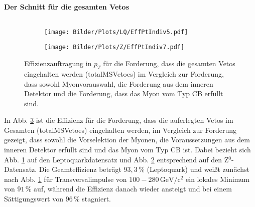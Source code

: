 \paragraph{Der Schnitt für die gesamten Vetos}$~~$\\
\begin{figure}
  \begin{subfigure}[t]{0.55\textwidth}
  \texttt{[image: Bilder/Plots/LQ/EffPtIndiv5.pdf]}
  \label{EffPtIndiv5LQ}
  \end{subfigure}
\begin{subfigure}[t]{0.55\textwidth}
 \texttt{[image: Bilder/Plots/Z/EffPtIndiv7.pdf]}
  \label{EffPtIndiv5Z}
\end{subfigure}
\caption{Effizienzauftragung in $p_T$ für die Forderung, dass die gesamten Vetos eingehalten werden (totalMSVetoes) im Vergleich zur Forderung, dass sowohl Myonvorauswahl, die Forderung aus dem inneren Detektor und die Forderung, dass das Myon vom Typ CB erfüllt sind.}
\label{EffPtIndiv5}
\end{figure}
In Abb. \ref{EffPtIndiv5} ist die Effizienz für die Forderung, dass die auferlegten Vetos im Gesamten (totalMSVetoes) eingehalten werden, im Vergleich zur Forderung gezeigt, dass sowohl die Vorselektion der Myonen, die Voraus\-setz\-ungen aus dem inneren Detektor erfüllt sind und das Myon vom Typ CB ist. Dabei bezieht sich Abb. \ref{EffPtIndiv5LQ} auf den Leptoquarkdatensatz und Abb. \ref{EffPtIndiv5Z} entsprechend auf den Z$^0$-Datensatz. Die Geamteffizienz beträgt $93,3\,\%$ (Leptoquark) und weißt zunächst nach Abb. \ref{EffPtIndiv5LQ} für Transversalimpulse von $100-280\,\text{GeV}/\text{c}^2$ ein lokales Minimum von $91\,\%$ auf, während die Effizienz danach wieder ansteigt und bei einem Sättigungswert von $96\,\%$ stagniert.

